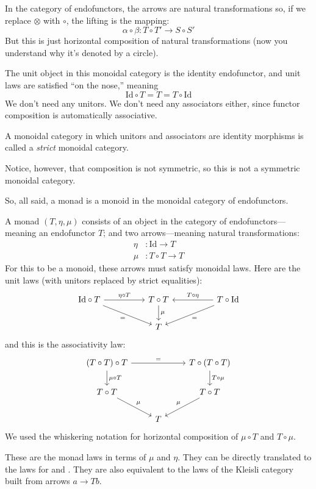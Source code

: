 \documentclass[DaoFP]{subfiles}
\begin{document}
 In the category of endofunctors, the arrows are natural transformations so, if we replace $\otimes$ with $\circ$, the lifting is the mapping:
\[ \alpha \circ \beta \colon T \circ T' \to S \circ S' \]
But this is just horizontal composition of natural transformations (now you understand why it's denoted by a circle).

The unit object in this monoidal category is the identity endofunctor, and unit laws are satisfied ``on the nose,'' meaning
\[ \text{Id} \circ T = T = T \circ \text{Id}\]
We don't need any unitors. We don't need any associators either, since functor composition is automatically associative. 

A monoidal category in which unitors and associators are identity morphisms is called a \emph{strict} monoidal category.

Notice, however, that composition is not symmetric, so this is not a symmetric monoidal category.

So, all said, a monad is a monoid in the monoidal category of endofunctors. 

A monad $(T, \eta, \mu)$ consists of an object in the category of endofunctors---meaning an endofunctor $T$; and two arrows---meaning natural transformations:
\begin{align*}
 \eta &\colon \text{Id} \to T \\
 \mu &\colon T \circ T \to T 
\end{align*}
For this to be a monoid, these arrows must satisfy monoidal laws. Here are the unit laws (with unitors replaced by strict equalities):
\[
 \begin{tikzcd}
\text{Id} \circ T
 \arrow[rr, "\eta \circ T"]
 \arrow[rrd, "="']
& & T \circ T
 \arrow[d, "\mu"]
&& T \circ \text{Id}
 \arrow[ll, "T \circ \eta"']
 \arrow[lld, "="]
 \\
 && T
  \end{tikzcd}
\]
and this is the associativity law:
\[
 \begin{tikzcd}
 (T \circ T) \circ T 
 \arrow[rr, "="]
 \arrow[d, "\mu \circ T"]
 &&
 T \circ (T \circ T)
 \arrow[d, "T \circ \mu"]
 \\
 T \circ T 
 \arrow[dr, "\mu"]
& & T \circ T
 \arrow[dl, "\mu"']
 \\
&  T
 \end{tikzcd}
\]
We used the whiskering notation for horizontal composition of $\mu \circ T$ and $T \circ \mu$.

These are the monad laws in terms of $\mu$ and $\eta$. They can be directly translated to the laws for  and . They are also equivalent to the laws of the Kleisli category built from arrows $a \to T b$.
\end{document}

